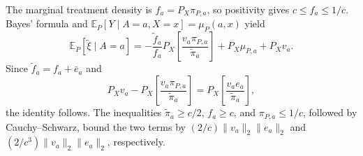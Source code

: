 The marginal treatment density is \(f_a=P_X\pi_{P,a}\), so positivity gives \(c\le f_a\le1/c\). Bayes' formula and \(\mathbb E_P[Y\mid A=a,X=x]=\mu_P(a,x)\) yield
\[
\mathbb E_P[\widetilde\xi\mid A=a]
=-\frac{\widetilde f_a}{f_a}P_X\!\left[\frac{v_a\pi_{P,a}}{\widetilde\pi_a}\right]+P_X\mu_{P,a}+P_Xv_a.
\]
Since \(\widetilde f_a=f_a+\bar e_a\) and
\[
P_Xv_a-P_X\!\left[\frac{v_a\pi_{P,a}}{\widetilde\pi_a}\right]
=P_X\!\left[\frac{v_ae_a}{\widetilde\pi_a}\right],
\]
the identity follows. The inequalities \(\widetilde\pi_a\ge c/2\), \(f_a\ge c\), and \(\pi_{P,a}\le1/c\), followed by Cauchy--Schwarz, bound the two terms by \((2/c)\lVert v_a\rVert_2\lVert e_a\rVert_2\) and \((2/c^3)\lVert v_a\rVert_2\lVert e_a\rVert_2\), respectively.